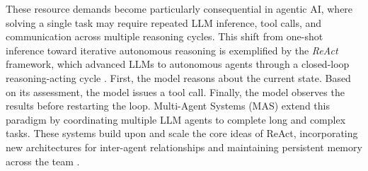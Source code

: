 \documentclass[journal,twoside,web]{ieeecolor_no_firstpage_logo}
\begin{document}


These resource demands become particularly consequential in agentic AI, where solving a single task may require repeated LLM inference, tool calls, and communication across multiple reasoning cycles.
This shift from one-shot inference toward iterative autonomous reasoning is exemplified by the \emph{ReAct} framework, which advanced LLMs to autonomous agents through a closed-loop reasoning-acting cycle \cite{bib16}. First, the model reasons about the current state. Based on its assessment, the model issues a tool call. Finally, the model observes the results before restarting the loop.
Multi-Agent Systems (MAS) extend this paradigm by coordinating multiple LLM agents to complete long and complex tasks. These systems build upon and scale the core ideas of ReAct, incorporating new architectures for inter-agent relationships and maintaining persistent memory across the team \cite{bib17}.


\end{document}
